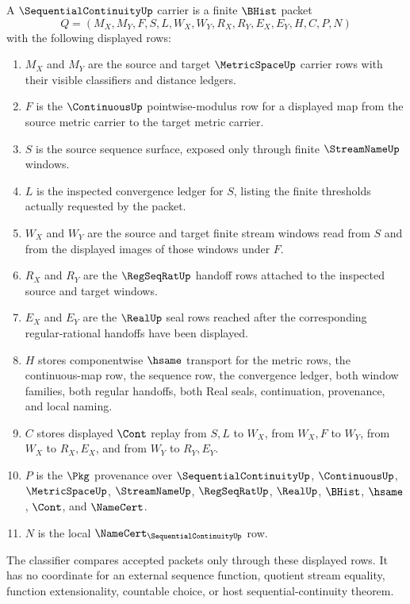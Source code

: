 \begin{definition}
\label{def:sequential-continuity-carrier}
A $\SequentialContinuityUp$ carrier is a finite $\BHist$ packet
$$
Q=(M_X,M_Y,F,S,L,W_X,W_Y,R_X,R_Y,E_X,E_Y,H,C,P,N)
$$
with the following displayed rows:
\begin{enumerate}
\item $M_X$ and $M_Y$ are the source and target $\MetricSpaceUp$ carrier rows with their visible classifiers and distance ledgers.
\item $F$ is the $\ContinuousUp$ pointwise-modulus row for a displayed map from the source metric carrier to the target metric carrier.
\item $S$ is the source sequence surface, exposed only through finite $\StreamNameUp$ windows.
\item $L$ is the inspected convergence ledger for $S$, listing the finite thresholds actually requested by the packet.
\item $W_X$ and $W_Y$ are the source and target finite stream windows read from $S$ and from the displayed images of those windows under $F$.
\item $R_X$ and $R_Y$ are the $\RegSeqRatUp$ handoff rows attached to the inspected source and target windows.
\item $E_X$ and $E_Y$ are the $\RealUp$ seal rows reached after the corresponding regular-rational handoffs have been displayed.
\item $H$ stores componentwise $\hsame$ transport for the metric rows, the continuous-map row, the sequence row, the convergence ledger, both window families, both regular handoffs, both Real seals, continuation, provenance, and local naming.
\item $C$ stores displayed $\Cont$ replay from $S,L$ to $W_X$, from $W_X,F$ to $W_Y$, from $W_X$ to $R_X,E_X$, and from $W_Y$ to $R_Y,E_Y$.
\item $P$ is the $\Pkg$ provenance over $\SequentialContinuityUp$, $\ContinuousUp$, $\MetricSpaceUp$, $\StreamNameUp$, $\RegSeqRatUp$, $\RealUp$, $\BHist$, $\hsame$, $\Cont$, and $\NameCert$.
\item $N$ is the local $\NameCert_{\SequentialContinuityUp}$ row.
\end{enumerate}
The classifier compares accepted packets only through these displayed rows. It has no coordinate for an external sequence function, quotient stream equality, function extensionality, countable choice, or host sequential-continuity theorem.
\end{definition}

